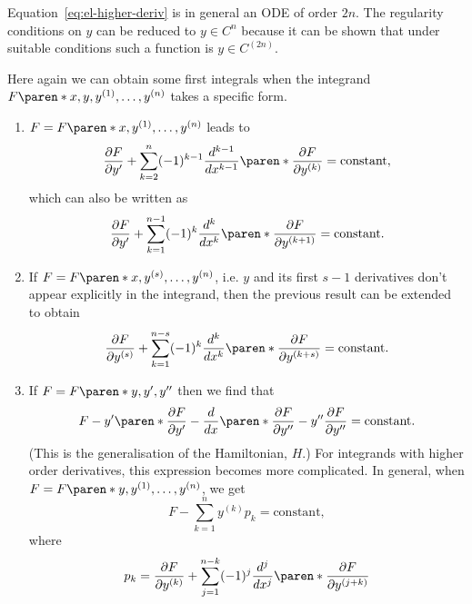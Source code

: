 \documentclass[11pt]{penrose}
\begin{document}
Equation~\eqref{eq:el-higher-deriv} is in general an ODE of order $2n$. The regularity conditions on $y$ can be reduced to $y \in C^n$ because it can be shown that under suitable conditions such a function is $y \in C^{(2n)}$.

Here again we can obtain some first integrals when the integrand $F\paren*{x, y, y^{(1)}, \dots, y^{(n)}}$ takes a specific form.
\begin{enumerate}
    \item $F = F\paren*{x, y^{(1)}, \dots, y^{(n)}}$ leads to
    \begin{equation}
        \frac{\pd F}{\pd y'} + \sum_{k=2}^{n} (-1)^{k-1} \frac{d^{k-1}}{dx^{k-1}} \paren*{\frac{\pd F}{\pd y^{(k)}}}
        = \text{constant},
    \end{equation}
    which can also be written as
    \begin{equation}
        \frac{\pd F}{\pd y'} + \sum_{k=1}^{n-1} (-1)^{k} \frac{d^{k}}{dx^{k}} \paren*{\frac{\pd F}{\pd y^{(k+1)}}}
        = \text{constant}.
    \end{equation}

    \item If $F = F\paren*{x, y^{(s)}, \dots, y^{(n)}}$, i.e. $y$ and its first $s-1$ derivatives don't appear explicitly in the integrand, then the previous result can be extended to obtain
    \begin{equation}
        \frac{\pd F}{\pd y^{(s)}}
        + \sum_{k=1}^{n-s} (-1)^{k} \frac{d^{k}}{dx^{k}} \paren*{\frac{\pd F}{\pd y^{(k+s)}}}
        = \text{constant}.
    \end{equation}

    \item If $F = F\paren*{y, y', y''}$ then we find that
    \begin{equation}
        F - y' \paren*{\frac{\pd F}{\pd y'} - \frac{d}{dx}\paren*{\frac{\pd F}{\pd y''}}} - y'' \frac{\pd F}{\pd y''}
        = \text{constant}.
    \end{equation}
    (This is the generalisation of the Hamiltonian, $H$.) For integrands with higher order derivatives, this expression becomes more complicated. In general, when $F = F\paren*{y, y^{(1)}, \dots, y^{(n)}}$, we get
    \begin{equation}
        F - \sum_{k=1}^{n} y^{(k)} p_{k} = \text{constant},
    \end{equation}
    where
    \begin{equation}
        p_k = \frac{\pd F}{\pd y^{(k)}}
        + \sum_{j=1}^{n-k} (-1)^{j} \frac{d^{j}}{dx^{j}} \paren*{ \frac{\pd F}{\pd y^{(j+k)}} }
    \end{equation}
\end{enumerate}
\end{document}
